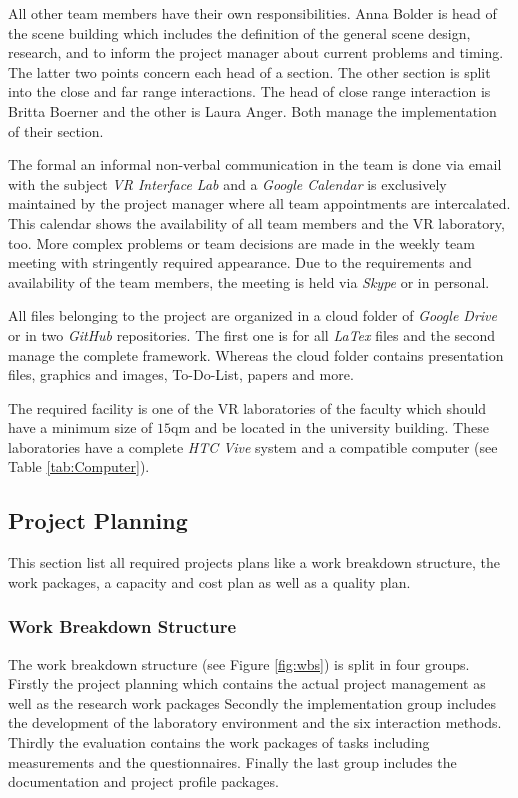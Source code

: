 All other team members have their own responsibilities. Anna Bolder is head of the scene building which includes the definition of the general scene design, research, and to inform the project manager about current problems and timing. The latter two points concern each head of a section. The other section is split into the close and far range interactions. The head of close range interaction is Britta Boerner and the other is Laura Anger. Both manage the implementation of their section.

The formal an informal non-verbal communication in the team is done via email with the subject \textit{VR Interface Lab} and a \textit{Google Calendar} is exclusively maintained by the project manager where all team appointments are intercalated. This calendar shows the availability of all team members and the VR laboratory, too. More complex problems or team decisions are made in the weekly team meeting with stringently required appearance. Due to the requirements and availability of the team members, the meeting is held via \textit{Skype} or in personal.

All files belonging to the project are organized in a cloud folder of \textit{Google Drive} or in two \textit{GitHub} repositories. The first one is for all \textit{LaTex} files and the second manage the complete framework. Whereas the cloud folder contains presentation files, graphics and images, To-Do-List, papers and more.

The required facility is one of the VR laboratories of the faculty which should have a minimum size of $15$qm and be located in the university building. These laboratories have a complete \textit{HTC Vive}
system and a compatible computer (see Table \ref{tab:Computer}).

\subsection{Project Planning} \label{sec:PMProjectPlanning}

This section list all required projects plans like a work breakdown structure, the work packages, a capacity and cost plan as well as a quality plan.
\subsubsection{Work Breakdown Structure}\label{sec:PMWBS}

The work breakdown structure (see Figure \ref{fig:wbs}) is split in four groups. Firstly the project planning which contains the actual project management as well as the research work packages Secondly the implementation group includes the development of the laboratory environment and the six interaction methods. Thirdly the evaluation contains the work packages of tasks including measurements and the questionnaires. Finally the last group includes the documentation and project profile packages.

